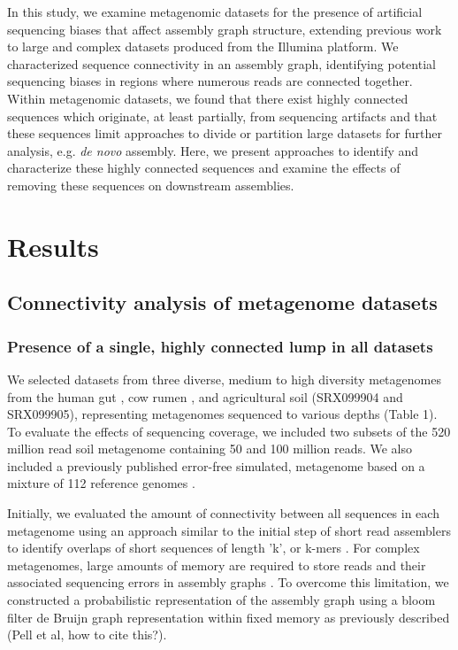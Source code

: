 \documentclass[10pt]{article}
\begin{document}
In this study, we examine metagenomic datasets for the presence of
artificial sequencing biases that affect assembly graph structure,
extending previous work to large and complex datasets produced from
the Illumina platform. We characterized sequence connectivity in an
assembly graph, identifying potential sequencing biases in regions
where numerous reads are connected together.  Within metagenomic
datasets, we found that there exist highly connected sequences which
originate, at least partially, from sequencing artifacts and that
these sequences limit approaches to divide or partition large datasets
for further analysis, e.g. {\em de novo} assembly.  Here, we present
approaches to identify and characterize these highly connected
sequences and examine the effects of removing these sequences on
downstream assemblies.

\section*{Results}

\subsection*{Connectivity analysis of metagenome datasets}

\subsubsection*{Presence of a single, highly connected lump in all datasets}
We selected datasets from three diverse, medium to high diversity
metagenomes from the human gut \cite{Qin:2010p189}, cow rumen
\cite{Hess:2011p686}, and agricultural soil (SRX099904 and SRX099905),
representing metagenomes sequenced to various depths (Table 1).  To
evaluate the effects of sequencing coverage, we included two subsets
of the 520 million read soil metagenome containing 50 and 100 million
reads.  We also included a previously published error-free simulated,
metagenome based on a mixture of 112 reference genomes
\cite{Pignatelli:2011p742}.

Initially, we evaluated the amount of connectivity between all
sequences in each metagenome using an approach similar to the initial
step of short read assemblers to identify overlaps of short sequences
of length 'k', or k-mers
\cite{Peng:2011p898,Simpson:2009p233,Zerbino:2008p665}.  For complex
metagenomes, large amounts of memory are required to store reads and
their associated sequencing errors in assembly graphs
\cite{Hess:2011p686,Mackelprang:2011p1087,Qin:2010p189}.  To overcome
this limitation, we constructed a probabilistic representation of the
assembly graph using a bloom filter de Bruijn graph representation
within fixed memory as previously described (Pell et al, how to cite
this?).
\end{document}
